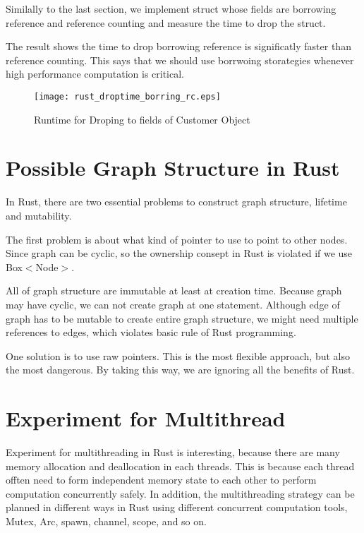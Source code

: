 Similally to the last section, we implement struct whose fields are borrowing reference and reference counting and measure the time to drop the struct. 

The result shows the time to drop borrowing reference is significatly faster than reference counting. This says that we should use borrwoing storategies whenever high performance computation is critical.


\begin{figure}[htb]
    \texttt{[image: rust\_droptime\_borring\_rc.eps]}
    \caption{Runtime for Droping to fields of Customer Object}
    \label{fig:Sampling}
\end{figure}

\section{Possible Graph Structure in Rust}
\label{sec:history}
In Rust, there are two essential problems to construct graph structure, lifetime and mutability. 

The first problem is about what kind of pointer to use to point to other nodes. 
Since graph can be cyclic, so the ownership consept in Rust is violated if we use Box$<$Node$>$.

All of graph structure are immutable at least at creation time. Because graph may have cyclic, 
we can not create graph at one statement. Although edge of graph has to be mutable to create entire graph structure, 
we might need multiple references to edges, which violates basic rule of Rust programming.

One solution is to use raw pointers. This is the most flexible approach, but also the most dangerous. 
By taking this way, we are ignoring all the benefits of Rust.

\section{Experiment for Multithread}
\label{sec:history}
Experiment for multithreading in Rust is interesting, because there are many memory allocation and deallocation in each threads.
This is because each thread offten need to form independent memory state to each other to perform computation concurrently safely.
In addition, the multithreading strategy can be planned in different ways in Rust using different concurrent computation tools, 
Mutex, Arc, spawn, channel, scope, and so on.

